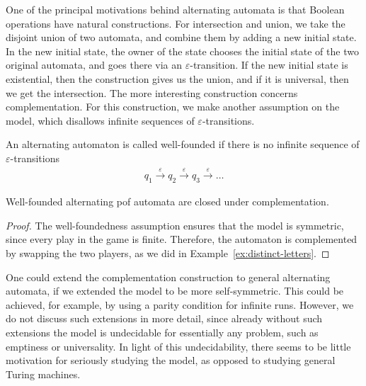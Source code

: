 One of the principal motivations behind alternating automata is that Boolean operations have natural constructions.  For intersection and union, we take the disjoint union of two automata, and combine them by adding a new initial state. In the new initial state,  the owner of the state chooses the initial state of the  two original automata, and goes there via an $\varepsilon$-transition. If the new initial state is existential, then the construction gives us the union, and if it is universal, then we get the intersection. The more interesting construction concerns complementation. 
For this construction, we make another assumption on the model, which  disallows infinite sequences of $\varepsilon$-transitions.

\begin{definition}
	\label{def:well-founded}
	An alternating automaton is called well-founded if there is no infinite sequence of $\varepsilon$-transitions 
	\begin{align*}
	q_1 \stackrel \varepsilon \to q_2 \stackrel \varepsilon \to q_3 \stackrel \varepsilon \to \ldots
	\end{align*}
\end{definition}
\begin{theorem}
	Well-founded alternating pof automata are closed under complementation.
\end{theorem}
\begin{proof} The well-foundedness assumption ensures that the model is symmetric, since every play in the game is finite. Therefore, the automaton is complemented by swapping the two players, as  we did in Example~\ref{ex:distinct-letters}. 
\end{proof}


One could extend the complementation construction to general alternating automata, if we extended the model to be more self-symmetric. This could be achieved, for example, by using a parity condition for infinite runs. However, we do not discuss such extensions in more detail, since already without such extensions the model is undecidable for essentially any problem, such as  emptiness or universality. In light of this undecidability, there seems to be little motivation for seriously studying the model, as opposed to studying general Turing machines. 


\exercisepart





